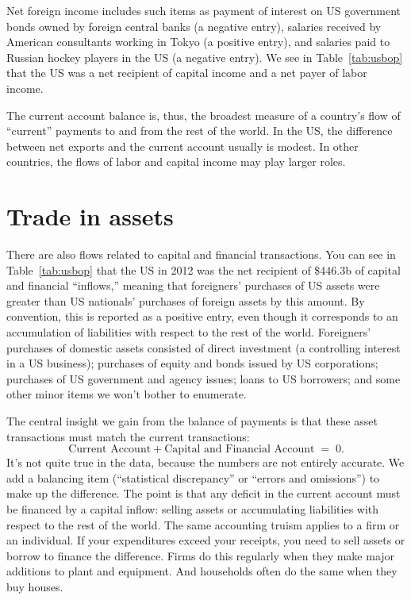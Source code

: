 Net foreign income includes such items as payment of interest
on US government bonds owned by foreign central banks  (a negative entry),
salaries received by American consultants working in Tokyo
(a positive entry),
and salaries paid to Russian hockey players in the US
(a negative entry).
We see in Table~\ref{tab:usbop} that
the US was a net recipient of capital income and a net payer
of labor income.


The current account balance is, thus, the broadest measure of a country's flow
of ``current'' payments to and from the rest of the world. In the
US, the difference between net exports and the current
account usually is modest. In other countries, the flows
of labor and capital income may play larger roles.



\section{Trade in assets}

There are also flows related to capital and financial
transactions.
You can see in Table~\ref{tab:usbop} that the US in 2012 was the net recipient of
\$446.3b of capital and financial ``inflows,'' meaning that
foreigners' purchases of US assets were greater than US nationals'
purchases of foreign assets by this amount.
By convention, this is reported as a
positive entry, even though it corresponds to an accumulation of
liabilities with respect to the rest of the world.  Foreigners' purchases
of domestic assets consisted of direct investment (a controlling
interest in a US business); purchases of equity and bonds issued by
US corporations; purchases of US government and agency issues; loans to US borrowers; and
some other minor items we won't bother to enumerate.

The central insight we gain from the balance of payments
is that these asset transactions must match the current transactions:
\[
    \mbox{Current Account} + \mbox{Capital and Financial Account} \;=\; 0.
\]
It's not quite true in the data, because the numbers are not
entirely accurate.
We add a balancing item
(``statistical discrepancy'' or ``errors and omissions'') to make up the
difference. The point is that any deficit in the current account
must be financed by a capital inflow:
selling assets or accumulating liabilities with
respect to the rest of the world.  The same accounting
 truism applies to a firm or an individual.  If your expenditures exceed
your receipts, you need to sell assets or borrow to finance the
difference. Firms do this regularly when they make major additions
to plant and equipment. And households often do the same when they
buy houses.

